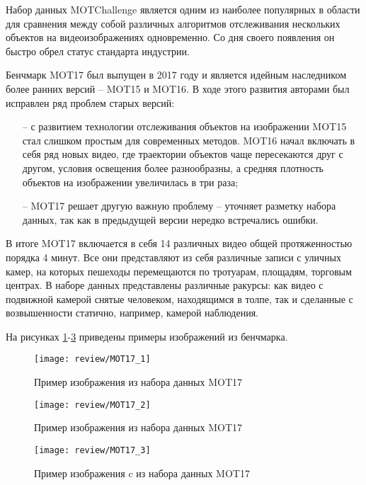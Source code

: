 Набор данных MOTChallenge \cite{dendorfer2021motchallenge} является одним из наиболее популярных в области для сравнения между собой различных алгоритмов отслеживания нескольких объектов на видеоизображениях одновременно. 
Со дня своего появления он быстро обрел статус стандарта индустрии. 

Бенчмарк MOT17 был выпущен в 2017 году и является идейным наследником более ранних версий -- MOT15 и MOT16. В ходе этого развития авторами был исправлен ряд проблем старых версий:
\begin{itemize}
    \item[--] с развитием технологии отслеживания объектов на изображении MOT15 стал слишком простым для современных методов. MOT16 начал включать в себя ряд новых видео, где траектории объектов чаще пересекаются друг с другом, условия освещения более разнообразны, а средняя плотность объектов на изображении увеличилась в три раза;
    \item[--] MOT17 решает другую важную проблему -- уточняет разметку набора данных, так как в предыдущей версии нередко встречались ошибки. 
\end{itemize}

В итоге MOT17 включается в себя 14 различных видео общей протяженностью порядка 4 минут. Все они представляют из себя различные записи с уличных камер, на которых пешеходы перемещаются по тротуарам, площадям, торговым центрах. 
В наборе данных представлены различные ракурсы: как видео с подвижной камерой снятые человеком, находящимся в толпе, так и сделанные с возвышенности статично, например, камерой наблюдения.

На рисунках \ref{fig:mot_1}-\ref{fig:mot_3} приведены примеры изображений из бенчмарка.

\begin{figure}[ht]
    \centering
    \texttt{[image: review/MOT17\_1]}
    \caption{Пример изображения из набора данных MOT17 \cite[страница 850, рисунок 3]{dendorfer2021motchallenge}}
    \label{fig:mot_1}
\end{figure}

\begin{figure}[ht]
    \centering
    \texttt{[image: review/MOT17\_2]}
    \caption{Пример изображения из набора данных MOT17 \cite[страница 850, рисунок 3]{dendorfer2021motchallenge}}
    \label{fig:mot_2}
\end{figure}

\begin{figure}[ht]
    \centering
    \texttt{[image: review/MOT17\_3]}
    \caption{Пример изображения c из набора данных MOT17\cite[страница 850, рисунок 3]{dendorfer2021motchallenge}}
    \label{fig:mot_3}
\end{figure}

\FloatBarrier